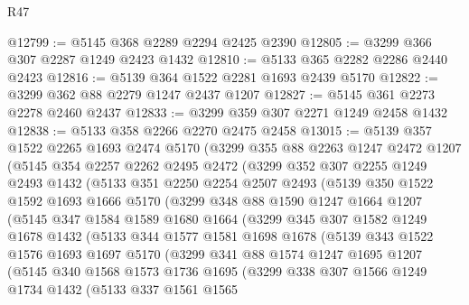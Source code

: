 \begin{lexlean}{R47}
\begin{coremodule}
@12799 := @5145 @368 @2289 @2294 @2425 @2390
@12805 := @3299 @366 @307 @2287 @1249 @2423 @1432
@12810 := @5133 @365 @2282 @2286 @2440 @2423
@12816 := @5139 @364 @1522 @2281 @1693 @2439 @5170
@12822 := @3299 @362 @88 @2279 @1247 @2437 @1207
@12827 := @5145 @361 @2273 @2278 @2460 @2437
@12833 := @3299 @359 @307 @2271 @1249 @2458 @1432
@12838 := @5133 @358 @2266 @2270 @2475 @2458
@13015 := @5139
    @357
    @1522
    @2265
    @1693
    @2474
    @5170
    (@3299
      @355
      @88
      @2263
      @1247
      @2472
      @1207
      (@5145
        @354
        @2257
        @2262
        @2495
        @2472
        (@3299
          @352
          @307
          @2255
          @1249
          @2493
          @1432
          (@5133
            @351
            @2250
            @2254
            @2507
            @2493
            (@5139
              @350
              @1522
              @1592
              @1693
              @1666
              @5170
              (@3299
                @348
                @88
                @1590
                @1247
                @1664
                @1207
                (@5145
                  @347
                  @1584
                  @1589
                  @1680
                  @1664
                  (@3299
                    @345
                    @307
                    @1582
                    @1249
                    @1678
                    @1432
                    (@5133
                      @344
                      @1577
                      @1581
                      @1698
                      @1678
                      (@5139
                        @343
                        @1522
                        @1576
                        @1693
                        @1697
                        @5170
                        (@3299
                          @341
                          @88
                          @1574
                          @1247
                          @1695
                          @1207
                          (@5145
                            @340
                            @1568
                            @1573
                            @1736
                            @1695
                            (@3299
                              @338
                              @307
                              @1566
                              @1249
                              @1734
                              @1432
                              (@5133
                                @337
                                @1561
                                @1565

\end{coremodule}
\end{lexlean}
